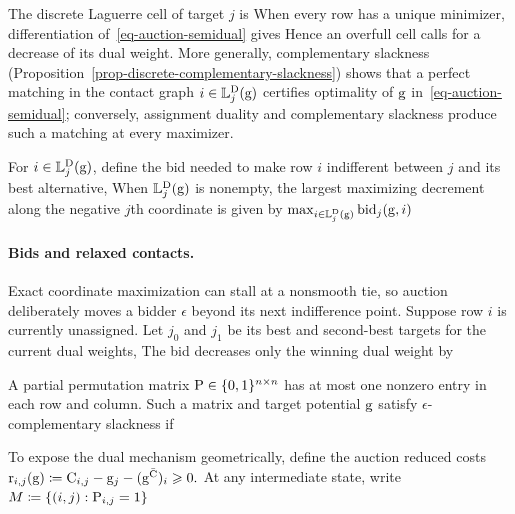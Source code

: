 The discrete Laguerre cell of target $j$ is
When every row has a unique minimizer, differentiation of~\eqref{eq-auction-semidual} gives
Hence an overfull cell calls for a decrease of its dual weight. More generally, complementary slackness (Proposition~\ref{prop-discrete-complementary-slackness}) shows that a perfect matching in the contact graph $i\in\Laguerre_j^{\rm D}(\gD)$ certifies optimality of $\gD$ in~\eqref{eq-auction-semidual}; conversely, assignment duality and complementary slackness produce such a matching at every maximizer.

For $i\in\Laguerre_j^{\rm D}(\gD)$, define the bid needed to make row $i$ indifferent between $j$ and its best alternative,
When $\Laguerre_j^{\rm D}(\gD)$ is nonempty, the largest maximizing decrement along the negative $j$th coordinate is given by
\(
\max_{i\in\Laguerre_j^{\rm D}(\gD)}\operatorname{bid}_j(\gD,i)
\)
\paragraph{Bids and relaxed contacts.}
Exact coordinate maximization can stall at a nonsmooth tie, so auction deliberately moves a bidder $\epsilon$ beyond its next indifference point. Suppose row $i$ is currently unassigned. Let $j_0$ and $j_1$ be its best and second-best targets for the current dual weights,
The bid decreases only the winning dual weight by
\begin{defn}\label{def-auction-eps-cs}
A partial permutation matrix $\P\in\{0,1\}^{n\times n}$ has at most one nonzero entry in each row and column. Such a matrix and target potential $\gD$ satisfy $\epsilon$-complementary slackness if
\end{defn}
To expose the dual mechanism geometrically, define the auction reduced costs
\(\mathrm{r}_{i,j}(\gD) \eqdef \C_{i,j}-\gD_j-(\gD^{\bar\C})_i \geq 0.\)
At any intermediate state, write
\(
M\eqdef\{(i,j):\P_{i,j}=1\}
\)
